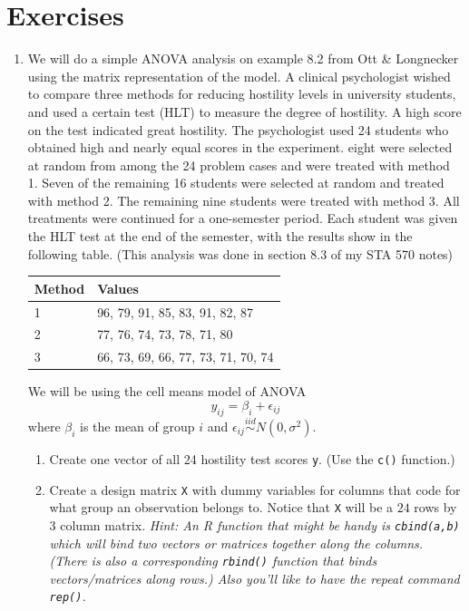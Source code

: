 \documentclass[]{book}
\theoremstyle{definition}
\theoremstyle{definition}
\theoremstyle{remark}
\begin{document}
\section{Exercises}\label{exercises-1}

\begin{enumerate}
\def\labelenumi{\arabic{enumi}.}
\item
  We will do a simple ANOVA analysis on example 8.2 from Ott \&
  Longnecker using the matrix representation of the model. A clinical
  psychologist wished to compare three methods for reducing hostility
  levels in university students, and used a certain test (HLT) to
  measure the degree of hostility. A high score on the test indicated
  great hostility. The psychologist used 24 students who obtained high
  and nearly equal scores in the experiment. eight were selected at
  random from among the 24 problem cases and were treated with method 1.
  Seven of the remaining 16 students were selected at random and treated
  with method 2. The remaining nine students were treated with method 3.
  All treatments were continued for a one-semester period. Each student
  was given the HLT test at the end of the semester, with the results
  show in the following table. (This analysis was done in section 8.3 of
  my STA 570 notes)

  \begin{longtable}[]{@{}ll@{}}
  \toprule
  Method & Values\tabularnewline
  \midrule
  \endhead
  1 & 96, 79, 91, 85, 83, 91, 82, 87\tabularnewline
  2 & 77, 76, 74, 73, 78, 71, 80\tabularnewline
  3 & 66, 73, 69, 66, 77, 73, 71, 70, 74\tabularnewline
  \bottomrule
  \end{longtable}

  We will be using the cell means model of ANOVA
  \[ y_{ij}=\beta_{i}+\epsilon_{ij} \] where \(\beta_{i}\) is the mean
  of group \(i\) and
  \(\epsilon_{ij}\stackrel{iid}{\sim}N\left(0,\sigma^{2}\right)\).

  \begin{enumerate}
  \def\labelenumii{\alph{enumii}.}
  \item
    Create one vector of all 24 hostility test scores \texttt{y}. (Use
    the \texttt{c()} function.)
  \item
    Create a design matrix \texttt{X} with dummy variables for columns
    that code for what group an observation belongs to. Notice that
    \texttt{X} will be a \(24\) rows by \(3\) column matrix. \emph{Hint:
    An R function that might be handy is \texttt{cbind(a,b)} which will
    bind two vectors or matrices together along the columns. (There is
    also a corresponding \texttt{rbind()} function that binds
    vectors/matrices along rows.) Also you'll like to have the repeat
    command \texttt{rep()}.}
  \end{enumerate}


\end{enumerate}
\end{document}
